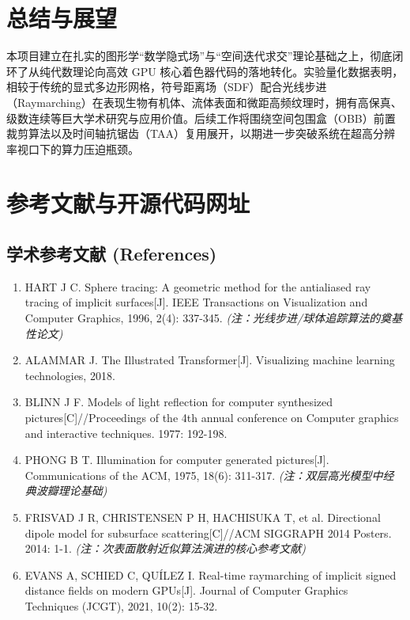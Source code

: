 \documentclass[11pt, a4paper, oneside]{report}
\begin{document}
\chapter{总结与展望}
本项目建立在扎实的图形学“数学隐式场”与“空间迭代求交”理论基础之上，彻底闭环了从纯代数理论向高效 GPU 核心着色器代码的落地转化。实验量化数据表明，相较于传统的显式多边形网格，符号距离场（SDF）配合光线步进（Raymarching）在表现生物有机体、流体表面和微距高频纹理时，拥有高保真、级数连续等巨大学术研究与应用价值。后续工作将围绕空间包围盒（OBB）前置裁剪算法以及时间轴抗锯齿（TAA）复用展开，以期进一步突破系统在超高分辨率视口下的算力压迫瓶颈。

\chapter{参考文献与开源代码网址}

\section{学术参考文献 (References)}
\begin{enumerate}
    \item[1] HART J C. Sphere tracing: A geometric method for the antialiased ray tracing of implicit surfaces[J]. IEEE Transactions on Visualization and Computer Graphics, 1996, 2(4): 337-345. \textit{(注：光线步进/球体追踪算法的奠基性论文)}
    \item[2] ALAMMAR J. The Illustrated Transformer[J]. Visualizing machine learning technologies, 2018. 
    \item[3] BLINN J F. Models of light reflection for computer synthesized pictures[C]//Proceedings of the 4th annual conference on Computer graphics and interactive techniques. 1977: 192-198.
    \item[4] PHONG B T. Illumination for computer generated pictures[J]. Communications of the ACM, 1975, 18(6): 311-317. \textit{(注：双层高光模型中经典波瓣理论基础)}
    \item[5] FRISVAD J R, CHRISTENSEN P H, HACHISUKA T, et al. Directional dipole model for subsurface scattering[C]//ACM SIGGRAPH 2014 Posters. 2014: 1-1. \textit{(注：次表面散射近似算法演进的核心参考文献)}
    \item[6] EVANS A, SCHIED C, QUÍLEZ I. Real-time raymarching of implicit signed distance fields on modern GPUs[J]. Journal of Computer Graphics Techniques (JCGT), 2021, 10(2): 15-32.
\end{enumerate}
\end{document}
